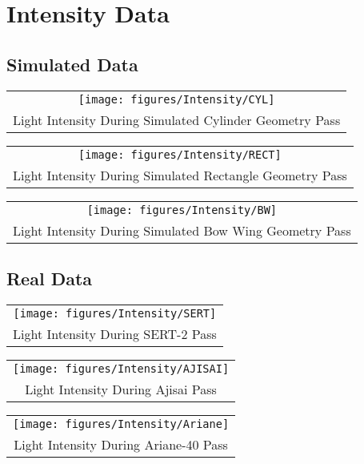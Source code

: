 \chapter{Intensity Data}

\section{Simulated Data}

\begin{center}
\begin{tabular}{c}
\texttt{[image: figures/Intensity/CYL]} \\
Light Intensity During Simulated Cylinder Geometry Pass
\end{tabular}
\end{center}

\begin{center}
\begin{tabular}{c}
	\texttt{[image: figures/Intensity/RECT]} \\
	Light Intensity During Simulated Rectangle Geometry Pass
\end{tabular}
\end{center}

\begin{center}
\begin{tabular}{c}
	\texttt{[image: figures/Intensity/BW]} \\
	Light Intensity During Simulated Bow Wing Geometry Pass
\end{tabular}
\end{center}

\section{Real Data}

\begin{center}
\begin{tabular}{c}
	\texttt{[image: figures/Intensity/SERT]} \\
	Light Intensity During SERT-2 Pass
\end{tabular}
\end{center}

\begin{center}
\begin{tabular}{c}
	\texttt{[image: figures/Intensity/AJISAI]} \\
	Light Intensity During Ajisai Pass
	
\end{tabular}
\end{center}

\begin{center}
\begin{tabular}{c}
	\texttt{[image: figures/Intensity/Ariane]} \\
	Light Intensity During Ariane-40 Pass
\end{tabular}
\end{center}